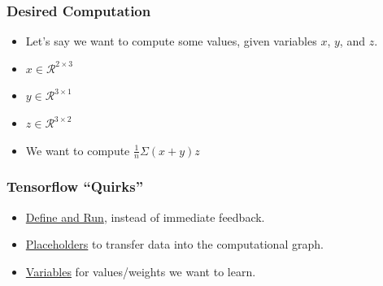 \documentclass{beamer}
\begin{document}
\begin{frame}
  \frametitle{Desired Computation}


  \begin{itemize}
    \item Let's say we want to compute some values, given variables $x$, $y$, and $z$.
    \item $x \in \mathcal{R}^{2 \times 3}$
    \item $y \in \mathcal{R}^{3 \times 1}$
    \item $z \in \mathcal{R}^{3 \times 2}$
    \item We want to compute $\frac{1}{n}\Sigma(x+y)z$
  \end{itemize}
\end{frame}

\begin{frame}
  \frametitle{Tensorflow ``Quirks''}
  \begin{itemize}
  \item \underline{Define and Run}, instead of immediate feedback.
  \item \underline{Placeholders} to transfer data into the computational graph.
  \item \underline{Variables} for values/weights we want to learn.
  \end{itemize}
\end{frame}
\end{document}
